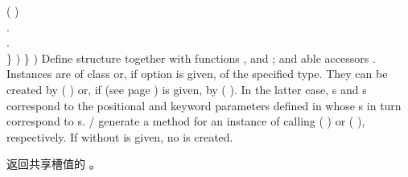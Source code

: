 \begin{LIST}{1cm}
{{{{{            ( )\\
          }{.}\\
        }{.}\\
      }{\}}%
      )%
    }{\}}
    )}
  {
    Define structure  together with functions
    ,  and
    ; and able accessors
    \LIT{-}. Instances are of class  or, if 
     option  is given, of the specified type.
    They can be
    created by ( ) or, if  (see
    page \pageref{section:函数}) is given, by (
     ). In the latter
    case, s and \kwd{:}s correspond to the positional
    and keyword parameters defined in  whose
    s in turn correspond to s.
    / generate a
     method for an instance  of 
    calling (  ) or (
      ), respectively.
    If  without  is given, no 
    is created.
}

  {
    返回共享槽值的 。
  }

\end{LIST}



